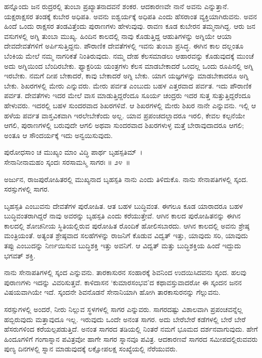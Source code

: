 ಹನ್ನೊಂದು ಜನ ರುದ್ರರಲ್ಲಿ ತುಂಬಾ ಪ್ರಖ್ಯಾತನಾದವನೆ ಶಂಕರ. ಆದಕಾರಣವೇ ನಾನೆ ಅವನು ಎನ್ನುತ್ತಾನೆ. ಯಕ್ಷರಾಕ್ಷಸರ ತಂಡಕ್ಕೆ ಕುಬೇರ ಅಧಿಪತಿ. ಅವನು ಐಶ್ವರ್ಯಕ್ಕೆ ಅಧಿಪತಿ ಎಂದು ಹೆಸರಾಂತ ವ್ಯಕ್ತಿಯಾಗಿರುವನು. ಅವನ ಹಿಂದೆ ಒಂದು ರಾಕ್ಷಸರ ತಂಡವಿತ್ತೆಂದು ಪುರಾಣಗಳು ಹೇಳುವುವು. ರಾವಣ ಕೂಡ ಕುಬೇರನ ತಮ್ಮನಾಗಿದ್ದ. ಆರು ಜನ ವಸುಗಳಲ್ಲಿ ಅಗ್ನಿ ತುಂಬಾ ಮುಖ್ಯ. ಹಿಂದಿನ ಕಾಲದಲ್ಲಿ ನಾವು ಕೊಡುತ್ತಿದ್ದ ಆಹುತಿಗಳನ್ನು ಅಗ್ನಿಯೇ ಆಯಾ ದೇವದೇವತೆಗಳಿಗೆ ಅರ್ಪಿಸುತ್ತಿದ್ದನು. ಪೌರಾಣಿಕ ದೇವತೆಗಳಲ್ಲಿ ಇವನು ತುಂಬಾ ಪ್ರಸಿದ್ಧ. ಈಗಿನ ಕಾಲ ದಲ್ಲಂತೂ ಬೆಂಕಿಯ ಮೇಲೆ ನಮ್ಮ ನಾಗರಿಕತೆ ನಿಂತಿರುವುದು. ನಮ್ಮ ದೇಹ ಕೆಲಸಮಾಡಲು ಆಹಾರವನ್ನು ಕೊಡುವುದಕ್ಕೆ ಮುಂಚೆ ಅದು ಅಗ್ನಿಯಿಂದ ಬೆಂದಿರಬೇಕು. ಫ್ಯಾಕ್ಟರಿಯ ಯಂತ್ರಗಳು ಕೆಲಸ ಮಾಡಬೇಕಾದರೆ ಒಂದಲ್ಲ ಒಂದು ರೂಪಿನಲ್ಲಿ ಅಗ್ನಿ ಇರಬೇಕು. ನಮಗೆ ದೀಪ ಬೇಕಾದರೆ, ಕಾವು ಬೇಕಾದರೆ ಅಗ್ನಿ ಬೇಕು. ಯಾಗ ಯಜ್ಞಗಳನ್ನು ಮಾಡಬೇಕಾದರೂ ಅಗ್ನಿ ಬೇಕು. ಶಿಖರಗಳಲ್ಲಿ ಮೇರು ಎನ್ನುವರು. ಮೇರು ಪರ್ವತ ಎಂಬುದು ಬಹಳ ಎತ್ತರವಾದ ಪರ್ವತ. ಇದು ಪೌರಾಣಿಕ ಪರ್ವತ. ದೇವತೆಗಳು ಇದರ ಮೇಲೆ ವಾಸ ಮಾಡುತ್ತಿದ್ದರೆಂದೂ ಸೂರ್ಯ ಚಂದ್ರರು ಇದರ ಸುತ್ತ ಸುತ್ತುತ್ತಿದ್ದರೆಂದೂ ಹೇಳುವರು. ಇದರಲ್ಲಿ ಬಹಳ ಸುಂದರವಾದ ಶಿಖರಗಳಿವೆ. ಆ ಶಿಖರಗಳಲ್ಲಿ ಮೇರು ಶಿಖರ ನಾನೇ ಎನ್ನುವನು. ಇಲ್ಲಿ ಆ ಹಳೆಯ ಪರ್ವತ ವಾಸ್ತವಿಕವಾಗಿ ಇರಲೇಬೇಕೆಂದು ಅಲ್ಲ. ಯಾವ ಪ್ರಪಂಚದಲ್ಲಾದರೂ ಇರಲಿ, ಕೇವಲ ಕಲ್ಪನೆಯೇ ಆಗಲಿ, ಪುರಾಣಗಳಲ್ಲಿ ಬರುವುದೇ ಆಗಲಿ ಅಥವಾ ಸುಂದರವಾದ ಶಿಖರಗಳುಳ್ಳ ಮತ್ತೆ ಬೇರಾವುದಾದರೂ ಆಗಲಿ; ಅಂತೂ ಆ ಸೌಂದರ್ಯಕ್ಕೆ ಇದು ಅನ್ವಯಿಸುವುದು.

\begin{shloka}
ಪುರೋಧಸಾಂ ಚ ಮುಖ್ಯಂ ಮಾಂ ವಿದ್ಧಿ ಪಾರ್ಥ ಬೃಹಸ್ಪತಿಮ್~।\\ಸೇನಾನೀನಾಮಹಂ ಸ್ಕಂದಃ ಸರಸಾಮಸ್ಮಿ ಸಾಗರಃ \hfill॥ ೨೪~॥
\end{shloka}

\begin{artha}
ಅರ್ಜುನ, ರಾಜಪುರೋಹಿತರಲ್ಲಿ ಮುಖ್ಯನಾದ ಬೃಹಸ್ಪತಿ ನಾನು ಎಂದು ತಿಳಿದುಕೊ. ನಾನು ಸೇನಾಪತಿಗಳಲ್ಲಿ ಸ್ಕಂದ. ಸರಸ್ಸುಗಳಲ್ಲಿ ಸಾಗರ.
\end{artha}

ಬೃಹಸ್ಪತಿ ಎಂಬುವನು ದೇವತೆಗಳ ಪುರೋಹಿತ. ಆತ ಬಹಳ ಬುದ್ಧಿವಂತ. ಈಗಲೂ ಕೂಡ ಯಾರಾದರೂ ಬಹಳ ಬುದ್ಧಿವಂತರಾಗಿದ್ದರೆ ನಾವು ಅವರನ್ನು ಬೃಹಸ್ಪತಿ ಎಂದು ಕರೆಯುತ್ತೇವೆ. ಆಗಿನ ಕಾಲದ ಪುರೋಹಿತನನ್ನು ಈಗಿನ ಕಾಲದಲ್ಲಿ ಶೋಚನೀಯ ಸ್ಥಿತಿಯಲ್ಲಿರುವ ಪುರೋಹಿತ ರೊಂದಿಕೆ ಹೋಲಿಸಬಾರದು. ಆಗಿನ ಕಾಲದಲ್ಲಿ ಅವನು ಶ್ರೇಷ್ಠ ಮಂತ್ರಿಯಂತೆ. ಅತ್ಯಂತ ಶ್ರೇಷ್ಠವಾದ ಸಲಹೆಗಳನ್ನು ರಾಜನಿಗೆ ಕೊಡುವ ವಿದ್ವತ್ ಇತ್ತು, ಯಾವುದು ಸರಿ, ಯಾವುದು ತಪ್ಪು ಎಂಬುದನ್ನು ನಿರ್ಣಯಿಸುವ ಬುದ್ಧಿಶಕ್ತಿ ಇತ್ತು ಅವನಿಗೆ. ಆ ವಿದ್ವತ್ ಮತ್ತು ಬುದ್ಧಿಶಕ್ತಿಯ ಹಿಂದೆ ಇದ್ದುದು ಭಗವತ್ ಶಕ್ತಿ.

ನಾನು ಸೇನಾಪತಿಗಳಲ್ಲಿ ಸ್ಕಂದ ಎನ್ನುವನು. ತಾರಕಾಸುರನ ಸಂಹಾರಕ್ಕೆ ಶಿವನಿಂದ ಉದಯಿಸಿ\-ದವನು ಸ್ಕಂದ. ಹಲವು ಪುರಾಣಗಳು ಇದನ್ನು ವಿವರಿಸುತ್ತವೆ. ಕಾಳಿದಾಸನ ‘ಕುಮಾರಸಂಭವ’ದ ಕಥಾವಸ್ತುವಾದರೋ ಈ ಸ್ಕಂದನ ಜನನ ವಿಷಯವಾಗಿಯೇ ಇದೆ. ಸ್ಕಂದನೇ ಶಿವನೊಡನೆ ಸೇನಾನಿಯಾಗಿ ಹೋಗಿ ತಾರಕಾಸುರನನ್ನು ಗೆಲ್ಲುವನು.

ಸರಸ್ಸುಗಳಲ್ಲಿ ಅಂದರೆ, ನೀರು ನಿಲ್ಲುವ ಸ್ಥಳಗಳಲ್ಲಿ ಸಾಗರ ಎನ್ನುವರು. ಸಾಗರದಷ್ಟು ವಿಶಾಲವಾಗಿ ಪ್ರಪಂಚವನ್ನೆಲ್ಲ ಹಬ್ಬಿರುವುದು ಮತ್ತಾವುದೂ ಇಲ್ಲ. ಇರುವುದು ಒಂದೇ ಅನಂತ ಸಾಗರ. ಅದು ಬೇರೆಬೇರೆ ಕಡೆಗಳಲ್ಲಿ ಬೇರೆ ಬೇರೆ ಹೆಸರುಗಳಿಂದ ಕರೆಯಲ್ಪಪಡುತ್ತಿದೆ. ಅನಂತ ಸಾಗರದ ತಡಿಯಲ್ಲಿ ನಿಂತರೆ ನಮಗೆ ಭೂಮದ ದರ್ಶನವಾಗುವುದು. ಹೇಗೆ ಹಿಂದೂಗಳಿಗೆ ಗಂಗಾಸ್ನಾನ ಪವಿತ್ರವೋ ಹಾಗೇ ಸಾಗರ ಸ್ನಾನವೂ ಪವಿತ್ರ. ಆದಕಾರಣವೆ ಸಾಗರದ ಸಮೀಪದಲ್ಲಿರುವವರು ಪುಣ್ಯ ದಿನಗಳಲ್ಲಿ ಸ್ನಾನ ಮಾಡುವುದಕ್ಕೆ ಲಕ್ಷೋಪಲಕ್ಷ ಸಂಖ್ಯೆಯಲ್ಲಿ ನೆರೆಯುವರು.

